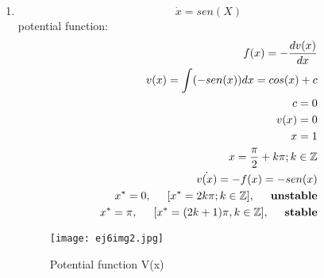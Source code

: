 \documentclass[a4paper,10pt]{article}
\begin{document}
\begin{enumerate}
\begin{enumerate}
\begin{figure}[h]
                    \label{fig:mesh1}
                \end{figure}
        \newpage        
        \item
            \begin{equation}
                \dot{x}=sen(X)
            \end{equation}
            potential function:
            \begin{equation}
                \begin{aligned}
                    f(x)=-\frac{dv(x)}{dx}\\
                    v(x)=\int (-sen(x))dx= cos(x) + c\\
                    c=0\\
                    v(x)=0\\
                    x= 1\\
                    x=\frac{\pi}{2} + k\pi; k \in \mathbb Z\\
                    \dot{v(x)}=-f(x)=-sen(x)\\
                    x^{*}=0, \hspace{0.5cm}[x^{*}= 2k\pi; k \in \mathbb Z],\hspace{0.5cm} \textbf{unstable}\\
                    x^{*}=\pi, \hspace{0.5cm}[x^{*}=(2k+1)\pi,k  \in \mathbb Z],\hspace{0.5cm} \textbf{stable}\\
                \end{aligned}
            \end{equation}
                \begin{figure}[h]
                    \centering
                    \texttt{[image: ej6img2.jpg]}
                    \caption{Potential function V(x)}
                    \label{fig:mesh1}
                \end{figure}
                

\end{enumerate}
\end{enumerate}
\end{document}
